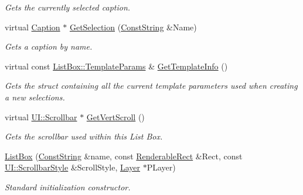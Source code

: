 \begin{DoxyCompactItemize}
\begin{DoxyCompactList}\small\item\em Gets the currently selected caption. \item\end{DoxyCompactList}\item 
virtual \hyperlink{classMezzanine_1_1UI_1_1Caption}{Caption} $\ast$ \hyperlink{classMezzanine_1_1UI_1_1ListBox_a793bd0f547a9f87ea74eb4204d591506}{GetSelection} (\hyperlink{namespaceMezzanine_a63cd699ac54b73953f35ec9cfc05e506}{ConstString} \&Name)
\begin{DoxyCompactList}\small\item\em Gets a caption by name. \item\end{DoxyCompactList}\item 
virtual const \hyperlink{structMezzanine_1_1UI_1_1ListBox_1_1TemplateParams}{ListBox::TemplateParams} \& \hyperlink{classMezzanine_1_1UI_1_1ListBox_a9f03e4ca7e393839bc004337bf39db50}{GetTemplateInfo} ()
\begin{DoxyCompactList}\small\item\em Gets the struct containing all the current template parameters used when creating a new selections. \item\end{DoxyCompactList}\item 
virtual \hyperlink{classMezzanine_1_1UI_1_1Scrollbar}{UI::Scrollbar} $\ast$ \hyperlink{classMezzanine_1_1UI_1_1ListBox_a68873b3f128512572564ef11e9b48309}{GetVertScroll} ()
\begin{DoxyCompactList}\small\item\em Gets the scrollbar used within this List Box. \item\end{DoxyCompactList}\item 
\hyperlink{classMezzanine_1_1UI_1_1ListBox_a60130f372bc78fbb20f28270bbed8cf2}{ListBox} (\hyperlink{namespaceMezzanine_a63cd699ac54b73953f35ec9cfc05e506}{ConstString} \&name, const \hyperlink{structMezzanine_1_1UI_1_1RenderableRect}{RenderableRect} \&Rect, const \hyperlink{namespaceMezzanine_1_1UI_a5998a9bf372a7e92605c0c461736e763}{UI::ScrollbarStyle} \&ScrollStyle, \hyperlink{classMezzanine_1_1UI_1_1Layer}{Layer} $\ast$PLayer)
\begin{DoxyCompactList}\small\item\em Standard initialization constructor. \item\end{DoxyCompactList}\item 

\end{DoxyCompactItemize}
